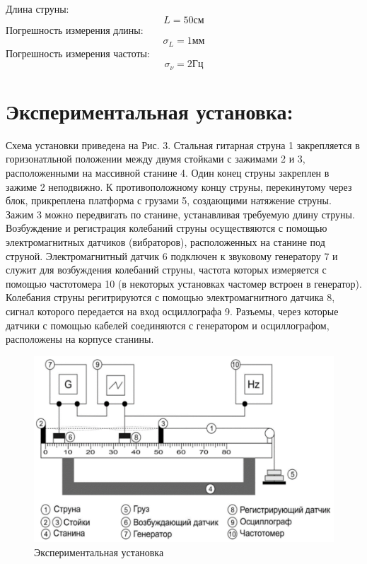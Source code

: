\documentclass[a4paper,12pt]{article} %
\begin{document}
Длина струны:
\[L = 50\text{см}\]
Погрешность измерения длины:
\[\sigma_L = 1\text{мм}\]
Погрешность измерения частоты:
\[\sigma_\nu=2\text{Гц}\]
\section{Экспериментальная установка:}
Схема установки приведена на Рис. 3. Стальная гитарная струна 1 закрепляется в горизонатльной положении между двумя стойками с зажимами 2 и 3, расположенными на массивной станине 4. Один конец струны закреплен в зажиме 2 неподвижно. К противоположному концу струны, перекинутому через блок, прикреплена платформа с грузами 5, создающими натяжение струны. Зажим 3 можно передвигать по станине, устанавливая требуемую длину струны. Возбуждение и регистрация колебаний струны осуществяются с помощью электромагнитных датчиков (вибраторов), расположенных на станине под струной. Электромагнитный датчик 6 подключен к звуковому генератору 7 и служит для возбуждения колебаний струны, частота которых измеряется с помощью частотомера 10 (в некоторых установках частомер встроен в генератор). Колебания струны регитрируются с помощью электромагнитного датчика 8, сигнал которого передается на вход осциллографа 9. Разъемы, через которые датчики с помощью кабелей соединяются с генератором и осциллографом, расположены на корпусе станины.
\begin{figure}[h]
\centering
\includegraphics[scale=0.5]{1}
\caption{Экспериментальная установка}
\end{figure}
\end{document}
